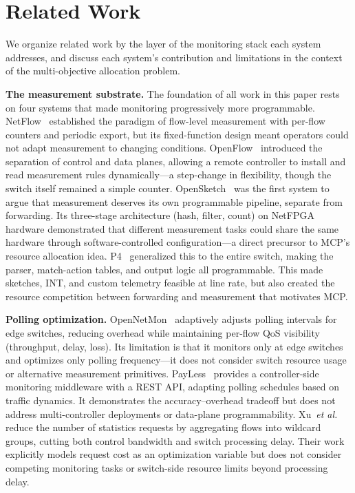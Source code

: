 \documentclass[letterpaper,twocolumn,10pt]{article}
\newcommand{\system}{MCP\xspace}
\newcommand{\etal}{\textit{et al.}\xspace}
\newcommand{\para}[1]{\smallskip\noindent\textbf{#1.}}
\begin{document}
\section{Related Work}
\label{sec:related}

We organize related work by the layer of the monitoring stack
each system addresses, and discuss each system's contribution and
limitations in the context of the multi-objective allocation
problem.

\para{The measurement substrate}
The foundation of all work in this paper rests on four systems
that made monitoring progressively more programmable.
NetFlow~\cite{claise2004netflow} established the paradigm of
flow-level measurement with per-flow counters and periodic export,
but its fixed-function design meant operators could not adapt
measurement to changing conditions.
OpenFlow~\cite{mckeown2008openflow} introduced the separation of
control and data planes, allowing a remote controller to install
and read measurement rules dynamically---a step-change in
flexibility, though the switch itself remained a simple
counter.
OpenSketch~\cite{yu2013opensketch} was the first system to argue
that measurement deserves its own programmable pipeline, separate
from forwarding. Its three-stage architecture (hash, filter,
count) on NetFPGA hardware demonstrated that different
measurement tasks could share the same hardware through
software-controlled configuration---a direct precursor to
\system's resource allocation idea.
P4~\cite{bosshart2014p4} generalized this to the entire switch,
making the parser, match-action tables, and output logic all
programmable. This made sketches, INT, and custom telemetry
feasible at line rate, but also created the resource competition
between forwarding and measurement that motivates \system.

\para{Polling optimization}
OpenNetMon~\cite{adrichem2014opennetmon} adaptively adjusts
polling intervals for edge switches, reducing overhead while
maintaining per-flow QoS visibility (throughput, delay, loss).
Its limitation is that it monitors only at edge switches and
optimizes only polling frequency---it does not consider switch
resource usage or alternative measurement primitives.
PayLess~\cite{chowdhury2014payless} provides a controller-side
monitoring middleware with a REST API, adapting polling schedules
based on traffic dynamics. It demonstrates the
accuracy--overhead tradeoff but does not address multi-controller
deployments or data-plane programmability.
Xu~\etal\cite{xu2017wildcard} reduce the number of statistics
requests by aggregating flows into wildcard groups, cutting both
control bandwidth and switch processing delay. Their work
explicitly models request cost as an optimization variable but
does not consider competing monitoring tasks or switch-side
resource limits beyond processing delay.
\end{document}

